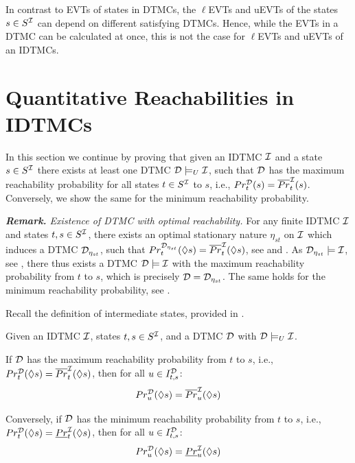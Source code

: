 In contrast to EVTs of states in DTMCs, the $\ell$EVTs and uEVTs of the states $s\in S^{\mathcal{I}}$ can depend on different satisfying DTMCs. Hence, while the EVTs in a DTMC can be calculated at once, this is not the case for $\ell$EVTs and uEVTs of an IDTMCs.

\section{Quantitative Reachabilities in IDTMCs}\label{sec:relating-reach-and-EVTs}
In this section we continue by proving that given an IDTMC $\mathcal{I}$ and a state $s\in S^{\mathcal{I}}$ there exists at least one DTMC $\mathcal{D} \models_U \mathcal{I}$, such that $\mathcal{D}$ has the maximum reachability probability for all states $t\in S^{\mathcal{I}}$ to $s$, i.e., $Pr^{\mathcal{D}}_t(s) = \overline{Pr}^{\mathcal{I}}_t(s)$. Conversely, we show the same for the minimum reachability probability. 

\emph{\textbf{Remark.} Existence of DTMC with optimal reachability.}\label{rem:existence}
For any finite IDTMC $\mathcal{I}$ and states $t,s\in S^{\mathcal{I}}$, there exists an optimal stationary nature $\eta_{st}$ on $\mathcal{I}$ which induces a DTMC $\mathcal{D}_{\eta_{st}}$, such that $Pr^{\mathcal{D}_{\eta_{st}}}_t(\lozenge s) = \overline{Pr}^{\mathcal{I}}_t(\lozenge s)$, see \cite[Lemma 10.102]{Bibel} and \cite{Badings2025}. As $\mathcal{D}_{\eta_{st}} \models \mathcal{I}$, see , there thus exists a DTMC
$\mathcal{D}\models\mathcal{I}$ with the maximum reachability probability from $t$ to $s$, which is precisely $\mathcal{D} = \mathcal{D}_{\eta_{st}}$. The same holds for the minimum reachability probability, see \cite[Lemma 10.113]{Bibel}.

 

Recall the definition of intermediate states, provided in .
\begin{theorem}\label{th:max_reach_prob_for_intermediate_states}
    Given an IDTMC $\mathcal{I}$, states $t,s\in S^{\mathcal{I}}$, and a DTMC $\mathcal{D}$ with $\mathcal{D}\models_U \mathcal{I}$.

    If $\mathcal{D}$ has the maximum reachability probability from $t$ to $s$, i.e., $Pr^{\mathcal{D}}_{t}(\lozenge s) = \overline{Pr}^{\mathcal{I}}_{t}(\lozenge s)$, then for all $u\in I^{\mathcal{D}}_{t,s}$:
    \[Pr^{\mathcal{D}}_{u}(\lozenge s) = \overline{Pr}^{\mathcal{I}}_{u}(\lozenge s)\]

    Conversely, if $\mathcal{D}$ has the minimum reachability probability from $t$ to $s$, i.e., $Pr^{\mathcal{D}}_{t}(\lozenge s) = \underline{Pr}^{\mathcal{I}}_{t}(\lozenge s)$, then for all $u\in I^{\mathcal{D}}_{t,s}$:
    \[Pr^{\mathcal{D}}_{u}(\lozenge s) = \underline{Pr}^{\mathcal{I}}_{u}(\lozenge s)\]
\end{theorem}

